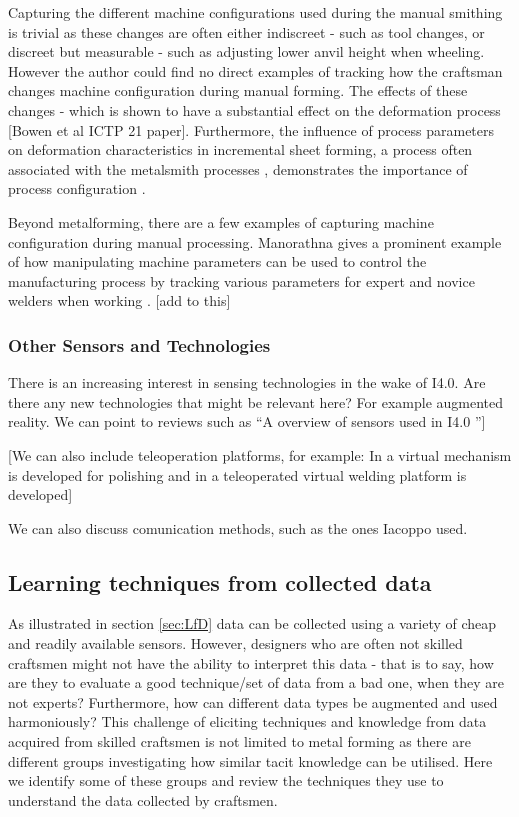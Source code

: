 Capturing the different machine configurations used during the manual smithing is trivial as these changes are often either indiscreet - such as tool changes, or discreet but measurable - such as adjusting lower anvil height when wheeling.  However the author could find no direct examples of tracking how the craftsman changes machine configuration during manual forming. The effects of these changes - which is shown to have a substantial effect on the deformation process [Bowen et al ICTP 21 paper]. Furthermore, the influence of process parameters on deformation characteristics in incremental sheet forming, a process often associated with the metalsmith processes \citep{Music2012TheTools}, demonstrates the importance of process configuration \citep{Gatea2016ReviewForming,Gohil2021ReviewProcess}.

Beyond metalforming, there are a few examples of capturing machine configuration during manual processing. Manorathna gives a prominent example of how manipulating machine parameters can be used to control the manufacturing process by tracking various parameters for expert and novice welders when working \citep{Manorathna2017HumanAutomation}. [add to this]


\subsubsection{Other Sensors and Technologies}

There is an increasing interest in sensing technologies in the wake of  I4.0. Are there any new technologies that might be relevant here? For example augmented reality. We can point to reviews such as ``A overview of sensors used in I4.0 \citep{Ruppert2018}'']



[We can also include teleoperation platforms, for example: In \citep{Nemec2018} a virtual mechanism is developed for polishing and in \citep{Liu2014} a teleoperated virtual welding platform is developed]

We can also discuss comunication methods, such as the ones Iacoppo used.



\subsection{Learning techniques from collected data}

As illustrated in section \ref{sec:LfD} data can be collected using a variety of cheap and readily available sensors. However, designers who are often not skilled craftsmen might not have the ability to interpret this data - that is to say, how are they to evaluate a good technique/set of data from a bad one, when they are not experts? Furthermore, how can different data types be augmented and used harmoniously? This challenge of eliciting techniques and knowledge from data acquired from skilled craftsmen is not limited to metal forming as there are different groups investigating how similar tacit knowledge can be utilised. Here we identify some of these groups and review the techniques they use to understand the data collected by craftsmen.

